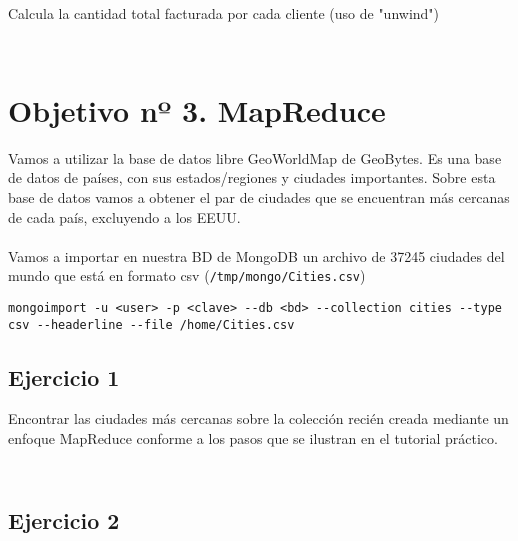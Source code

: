 Calcula la cantidad total facturada por cada cliente (uso de "unwind")

\begin{lstlisting}

\end{lstlisting}

\begin{lstlisting}

\end{lstlisting}

\section{Objetivo nº 3. MapReduce}

Vamos a utilizar la base de datos libre GeoWorldMap de GeoBytes. Es una base de datos de países, con sus estados/regiones y ciudades importantes. Sobre esta base de datos vamos a obtener el par de ciudades que se encuentran más cercanas de cada país, excluyendo a los EEUU.
\\ \\
Vamos a importar en nuestra BD de MongoDB un archivo de 37245 ciudades del mundo que está en formato csv (\texttt{/tmp/mongo/Cities.csv})

\begin{lstlisting}
mongoimport -u <user> -p <clave> --db <bd> --collection cities --type csv --headerline --file /home/Cities.csv
\end{lstlisting}

\subsection{Ejercicio 1}

Encontrar las ciudades más cercanas sobre la colección recién creada mediante un enfoque MapReduce conforme a los pasos que se ilustran en el tutorial práctico.

\begin{lstlisting}

\end{lstlisting}

\begin{lstlisting}

\end{lstlisting}

\subsection{Ejercicio 2}

